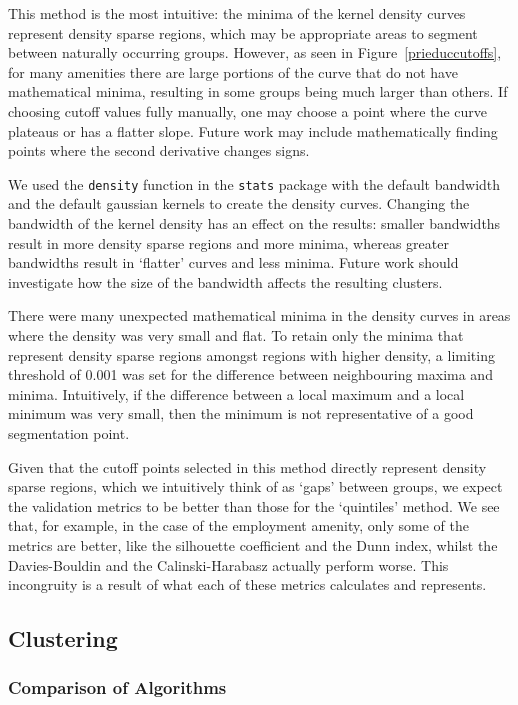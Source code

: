\documentclass[11pt, a4paper]{article}
\begin{document}
This method is the most intuitive: the minima of the kernel density curves represent density sparse regions, which may be appropriate areas to segment between naturally occurring groups. However, as seen in Figure~\ref{prieduccutoffs}, for many amenities there are large portions of the curve that do not have mathematical minima, resulting in some groups being much larger than others. If choosing cutoff values fully manually, one may choose a point where the curve plateaus or has a flatter slope. Future work may include mathematically finding points where the second derivative changes signs.
\par
We used the \texttt{density} function in the \texttt{stats} package with the default bandwidth and the default gaussian kernels to create the density curves. Changing the bandwidth of the kernel density has an effect on the results: smaller bandwidths result in more density sparse regions and more minima, whereas greater bandwidths result in `flatter' curves and less minima. Future work should investigate how the size of the bandwidth affects the resulting clusters.
\par
There were many unexpected mathematical minima in the density curves in areas where the density was very small and flat. To retain only the minima that represent density sparse regions amongst regions with higher density, a limiting threshold of 0.001 was set for the difference between neighbouring maxima and minima. Intuitively, if the difference between a local maximum and a local minimum was very small, then the minimum is not representative of a good segmentation point.
\par
Given that the cutoff points selected in this method directly represent density sparse regions, which we intuitively think of as `gaps' between groups, we expect the validation metrics to be better than those for the `quintiles' method. We see that, for example, in the case of the employment amenity, only some of the metrics are better, like the silhouette coefficient and the Dunn index, whilst the Davies-Bouldin and the Calinski-Harabasz actually perform worse. This incongruity is a result of what each of these metrics calculates and represents.





\subsection{Clustering}

\subsubsection{Comparison of Algorithms}
\end{document}
